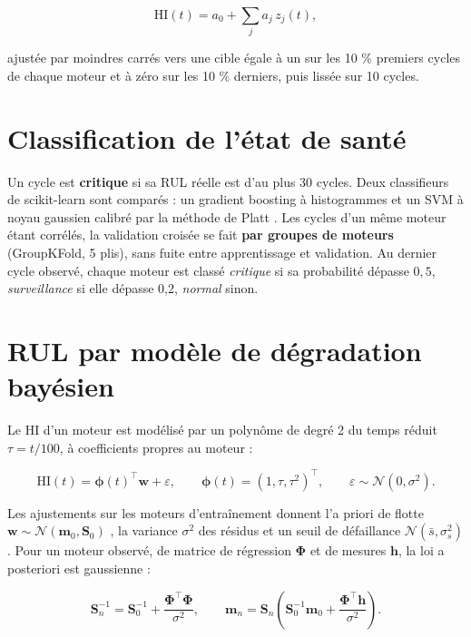 \begin{equation}\label{eq:hi}
\mathrm{HI}(t) = a_0 + \sum_j a_j\, z_j(t),
\end{equation}

ajustée par moindres carrés vers une cible égale à un sur les 10 \% premiers cycles de chaque moteur et à zéro sur les 10 \% derniers, puis lissée sur 10 cycles.

\section{Classification de l'état de santé}\label{sec:classification}

Un cycle est \textbf{critique} si sa RUL réelle est d'au plus 30 cycles. Deux classifieurs de scikit-learn \cite{pedregosa2011} sont comparés : un gradient boosting à histogrammes \cite{friedman2001,ke2017} et un SVM à noyau gaussien \cite{cortes1995} calibré par la méthode de Platt \cite{platt1999}. Les cycles d'un même moteur étant corrélés, la validation croisée se fait \textbf{par groupes de moteurs} (GroupKFold, 5 plis), sans fuite entre apprentissage et validation. Au dernier cycle observé, chaque moteur est classé \emph{critique} si sa probabilité dépasse $0{,}5$, \emph{surveillance} si elle dépasse 0,2, \emph{normal} sinon.

\section{RUL par modèle de dégradation bayésien}\label{sec:degradation}

Le HI d'un moteur est modélisé par un polynôme de degré 2 du temps réduit $\tau = t/100$, à coefficients propres au moteur :

\begin{equation}\label{eq:degradation}
\mathrm{HI}(t) = \boldsymbol\phi(t)^\top \mathbf w + \varepsilon, \qquad \boldsymbol\phi(t) = (1, \tau, \tau^2)^\top, \qquad \varepsilon \sim \mathcal N(0, \sigma^2).
\end{equation}

Les ajustements sur les moteurs d'entraînement donnent l'a priori de flotte $\mathbf w \sim \mathcal N(\mathbf m_0, \mathbf S_0)$ \cite{gebraeel2005}, la variance $\sigma^2$ des résidus et un seuil de défaillance $\mathcal N(\bar s, \sigma_s^2)$. Pour un moteur observé, de matrice de régression $\boldsymbol\Phi$ et de mesures $\mathbf h$, la loi a posteriori est gaussienne :

\begin{equation}\label{eq:posterior}
\mathbf S_n^{-1} = \mathbf S_0^{-1} + \frac{\boldsymbol\Phi^\top \boldsymbol\Phi}{\sigma^2}, \qquad \mathbf m_n = \mathbf S_n \left(\mathbf S_0^{-1} \mathbf m_0 + \frac{\boldsymbol\Phi^\top \mathbf h}{\sigma^2}\right).
\end{equation}

